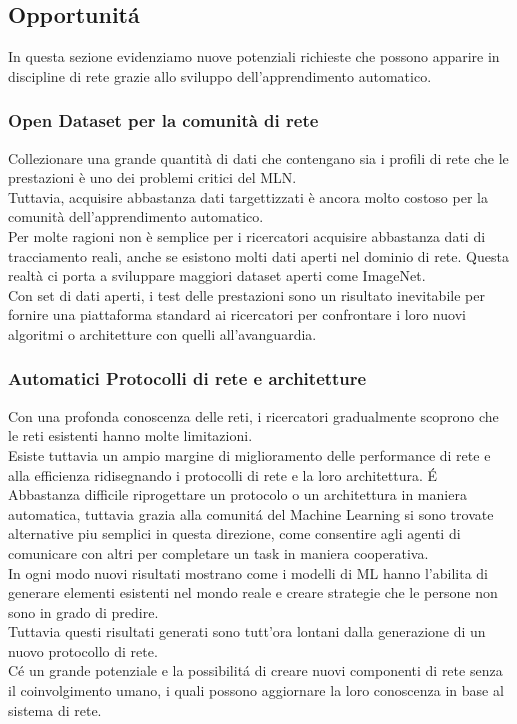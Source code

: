 \documentclass[../tesi.tex]{subfiles}
\begin{document}
\subsection{Opportunitá}
In questa sezione evidenziamo nuove potenziali richieste che possono apparire in discipline di rete grazie allo sviluppo dell’apprendimento automatico.

\subsubsection{Open Dataset per la comunità di rete}

Collezionare una grande quantità di dati che contengano sia i profili di rete che le prestazioni è uno dei problemi critici del MLN.\\
Tuttavia, acquisire abbastanza dati targettizzati è ancora molto costoso per la comunità dell’apprendimento automatico.\\
Per molte ragioni non è semplice per i ricercatori acquisire abbastanza dati di tracciamento reali, anche se esistono molti dati aperti nel dominio di rete.
Questa realtà ci porta a sviluppare maggiori dataset aperti come ImageNet.\\
Con set di dati aperti, i test delle prestazioni sono un risultato inevitabile per fornire una piattaforma standard ai ricercatori per confrontare i loro nuovi algoritmi o architetture con quelli all’avanguardia.

\subsubsection{Automatici Protocolli di rete e architetture}

Con una profonda conoscenza delle reti, i ricercatori gradualmente scoprono che le reti esistenti hanno molte limitazioni.\\
Esiste tuttavia un ampio margine di miglioramento delle performance di rete e alla efficienza ridisegnando i protocolli di rete e la loro architettura. É Abbastanza difficile riprogettare un protocolo o un architettura in maniera automatica, tuttavia grazia alla comunitá del Machine Learning si sono trovate alternative piu semplici in questa direzione, come consentire agli agenti di comunicare con altri per completare un task in maniera cooperativa.\\
In ogni modo nuovi risultati mostrano come i modelli di ML hanno l’abilita di generare elementi esistenti nel mondo reale e creare strategie che le persone non sono in grado di predire.\\
Tuttavia questi risultati generati sono tutt’ora lontani dalla generazione di un nuovo protocollo di rete.\\
Cé un grande potenziale e la possibilitá di creare nuovi componenti di rete senza il coinvolgimento umano, i quali possono aggiornare la loro conoscenza in base al sistema di rete.
\end{document}
